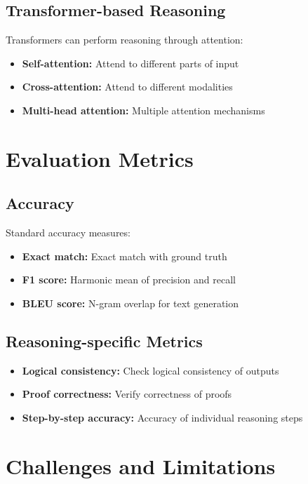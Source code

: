 \subsection{Transformer-based Reasoning}

Transformers can perform reasoning through attention:
\begin{itemize}
    \item \textbf{Self-attention:} Attend to different parts of input
    \item \textbf{Cross-attention:} Attend to different modalities
    \item \textbf{Multi-head attention:} Multiple attention mechanisms
\end{itemize}

\section{Evaluation Metrics}

\subsection{Accuracy}

Standard accuracy measures:
\begin{itemize}
    \item \textbf{Exact match:} Exact match with ground truth
    \item \textbf{F1 score:} Harmonic mean of precision and recall
    \item \textbf{BLEU score:} N-gram overlap for text generation
\end{itemize}

\subsection{Reasoning-specific Metrics}

\begin{itemize}
    \item \textbf{Logical consistency:} Check logical consistency of outputs
    \item \textbf{Proof correctness:} Verify correctness of proofs
    \item \textbf{Step-by-step accuracy:} Accuracy of individual reasoning steps
\end{itemize}

\section{Challenges and Limitations}

